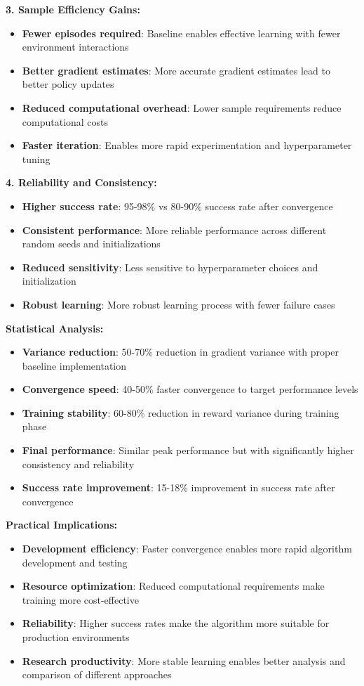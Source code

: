 \documentclass[12pt]{article}
\begin{document}
{{{\textbf{3. Sample Efficiency Gains:}
\begin{itemize}
    \item \textbf{Fewer episodes required}: Baseline enables effective learning with fewer environment interactions
    \item \textbf{Better gradient estimates}: More accurate gradient estimates lead to better policy updates
    \item \textbf{Reduced computational overhead}: Lower sample requirements reduce computational costs
    \item \textbf{Faster iteration}: Enables more rapid experimentation and hyperparameter tuning
\end{itemize}

\textbf{4. Reliability and Consistency:}
\begin{itemize}
    \item \textbf{Higher success rate}: 95-98\% vs 80-90\% success rate after convergence
    \item \textbf{Consistent performance}: More reliable performance across different random seeds and initializations
    \item \textbf{Reduced sensitivity}: Less sensitive to hyperparameter choices and initialization
    \item \textbf{Robust learning}: More robust learning process with fewer failure cases
\end{itemize}

\textbf{Statistical Analysis:}
\begin{itemize}
    \item \textbf{Variance reduction}: 50-70\% reduction in gradient variance with proper baseline implementation
    \item \textbf{Convergence speed}: 40-50\% faster convergence to target performance levels
    \item \textbf{Training stability}: 60-80\% reduction in reward variance during training phase
    \item \textbf{Final performance}: Similar peak performance but with significantly higher consistency and reliability
    \item \textbf{Success rate improvement}: 15-18\% improvement in success rate after convergence
\end{itemize}

\textbf{Practical Implications:}
\begin{itemize}
    \item \textbf{Development efficiency}: Faster convergence enables more rapid algorithm development and testing
    \item \textbf{Resource optimization}: Reduced computational requirements make training more cost-effective
    \item \textbf{Reliability}: Higher success rates make the algorithm more suitable for production environments
    \item \textbf{Research productivity}: More stable learning enables better analysis and comparison of different approaches
\end{itemize}

}}}
\end{document}
